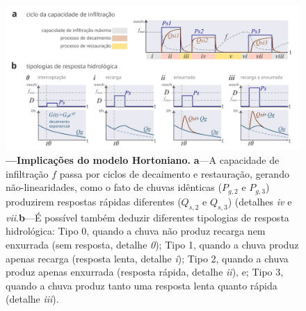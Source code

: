 \documentclass[./main.tex]{subfiles}
\begin{document}
\begin{figure}[t!] 
\centering				
\includegraphics[width=0.98\linewidth]{figs/fig_horton2.jpg}		
\caption[Implicações do modelo Hortoniano]
{\textbf{---\;Implicações do modelo Hortoniano.}
    \textbf{a}\;---\;A capacidade de infiltração $f$ passa por ciclos de decaimento e restauração, gerando não-linearidades, como o fato de chuvas idênticas ($P_{g,2}$ e $P_{g,3}$) produzirem respostas rápidas diferentes ($Q_{s,2}$ e $Q_{s,3}$) (detalhes \textrm{\textit{iv}} e \textrm{\textit{vii}}.\;\textbf{b}\;---\;É possível também deduzir diferentes tipologias de resposta hidrológica: Tipo 0, quando a chuva não produz recarga nem enxurrada (sem resposta, detalhe \textrm{\textit{0}}); Tipo 1, quando a chuva produz apenas recarga (resposta lenta, detalhe \textrm{\textit{i}}); Tipo 2, quando a chuva produz apenas enxurrada (resposta rápida, detalhe \textrm{\textit{ii}}), e; Tipo 3, quando a chuva produz tanto uma resposta lenta quanto rápida (detalhe \textrm{\textit{iii}}).
}
\label{fig:hydro:horton2} 		
\end{figure}
\end{document}
